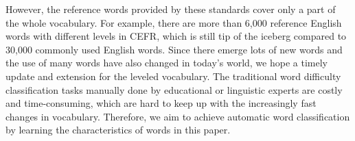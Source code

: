 However, the reference words provided by these standards
cover only a part of the whole vocabulary.
For example, there are more than 6,000 reference English words with different levels in CEFR, 
which is still tip of the iceberg compared to 30,000 commonly used English words.
Since there emerge lots of new words and the use of many words have also changed in today's world, we hope a timely update and extension for the leveled vocabulary.
The traditional word difficulty classification tasks manually done by
educational or linguistic experts are costly and time-consuming, which are hard to keep up with the increasingly fast changes in vocabulary.
Therefore, we aim to achieve automatic word classification by learning the characteristics of words in this paper.


